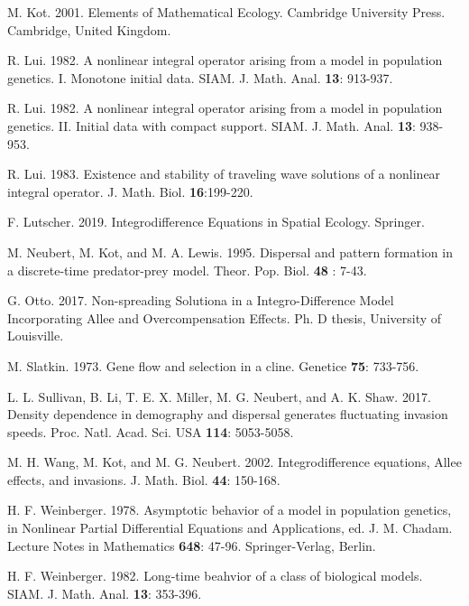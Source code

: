 \documentclass[11pt]{article}
\theoremstyle{definition}
\numberwithin{equation}{section}
\numberwithin{thm}{section}
\begin{document}
\begin{thebibliography}{9}
 M. Kot. 2001. Elements of Mathematical Ecology.
Cambridge University Press. Cambridge, United Kingdom.

 R. Lui. 1982. A nonlinear integral operator arising from a model in population
genetics. I. Monotone initial data. SIAM. J. Math. Anal. {\bf 13}:
913-937.

 R. Lui. 1982. A nonlinear integral operator arising from a model in population
genetics. II. Initial data with compact support. SIAM. J. Math.
Anal. {\bf 13}: 938-953.

 R. Lui. 1983. Existence and stability of traveling wave solutions of a nonlinear
integral operator. J. Math. Biol. {\bf 16}:199-220.

F. Lutscher. 2019. Integrodifference Equations in Spatial Ecology.  Springer.


 M. Neubert, M. Kot, and M. A. Lewis. 1995. Dispersal and pattern formation in a
discrete-time predator-prey model. Theor. Pop. Biol. {\bf 48}
: 7-43.

 G. Otto. 2017. Non-spreading Solutiona in a Integro-Difference Model Incorporating Allee and Overcompensation Effects. Ph. D thesis, University of Louisville.

 M. Slatkin. 1973. Gene flow and selection in a cline.
Genetice {\bf 75}: 733-756.



 L. L. Sullivan, B. Li, T. E. X. Miller, M. G. Neubert, and A. K. Shaw. 2017.
Density dependence in demography and dispersal generates fluctuating invasion speeds. Proc. Natl. Acad. Sci. USA {\bf
114}: 5053-5058.


 M. H. Wang, M. Kot, and M. G. Neubert. 2002. Integrodifference equations, Allee effects, and
invasions. J. Math. Biol. {\bf 44}: 150-168.

 H. F. Weinberger. 1978. Asymptotic behavior of a model in  population genetics,
in Nonlinear Partial Differential Equations  and Applications, ed.
J. M. Chadam. Lecture Notes in Mathematics {\bf 648}: 47-96.
Springer-Verlag, Berlin.

 H. F.  Weinberger. 1982. Long-time beahvior of a class of biological models. SIAM. J.
Math. Anal. {\bf 13}: 353-396.

\end{thebibliography}


\appendix
\end{document}

